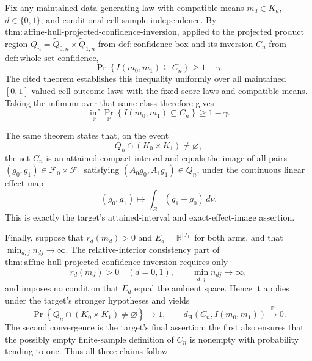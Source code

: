 Fix any maintained data-generating law with compatible means \(m_d\in K_d\), \(d\in\{0,1\}\), and conditional cell-sample independence.  By \(\mathrm{thm:affine\mbox{-}hull\mbox{-}projected\mbox{-}confidence\mbox{-}inversion}\), applied to the projected product region \(Q_n=\widetilde Q_{0,n}\times\widetilde Q_{1,n}\) from \(\mathrm{def:confidence\mbox{-}box}\) and its inversion \(C_n\) from \(\mathrm{def:whole\mbox{-}set\mbox{-}confidence}\),
\[
 \Pr\!\left\{I(m_0,m_1)\subseteq C_n\right\}\ge 1-\gamma.
\]
The cited theorem establishes this inequality uniformly over all maintained \([0,1]\)-valued cell-outcome laws with the fixed score laws and compatible means.  Taking the infimum over that same class therefore gives
\[
 \inf_{\mathbb P}\Pr_{\mathbb P}\!\left\{I(m_0,m_1)\subseteq C_n\right\}\ge 1-\gamma.
\]

The same theorem states that, on the event
\[
 Q_n\cap(K_0\times K_1)\ne\varnothing,
\]
the set \(C_n\) is an attained compact interval and equals the image of all pairs \((g_0,g_1)\in\mathcal F_0\times\mathcal F_1\) satisfying \((A_0g_0,A_1g_1)\in Q_n\), under the continuous linear effect map
\[
 (g_0,g_1)\longmapsto \int_B(g_1-g_0)\,d\nu.
\]
This is exactly the target's attained-interval and exact-effect-image assertion.

Finally, suppose that \(r_d(m_d)>0\) and \(E_d=\mathbb R^{|J_d|}\) for both arms, and that \(\min_{d,j}n_{dj}\to\infty\).  The relative-interior consistency part of \(\mathrm{thm:affine\mbox{-}hull\mbox{-}projected\mbox{-}confidence\mbox{-}inversion}\) requires only
\[
 r_d(m_d)>0\quad(d=0,1),
 \qquad
 \min_{d,j}n_{dj}\longrightarrow\infty,
\]
and imposes no condition that \(E_d\) equal the ambient space.  Hence it applies under the target's stronger hypotheses and yields
\[
 \Pr\!\left\{Q_n\cap(K_0\times K_1)\ne\varnothing\right\}\longrightarrow1,
 \qquad
 d_{\mathrm H}\!\left(C_n,I(m_0,m_1)\right)\xrightarrow{\mathbb P}0.
\]
The second convergence is the target's final assertion; the first also ensures that the possibly empty finite-sample definition of \(C_n\) is nonempty with probability tending to one.  Thus all three claims follow.
